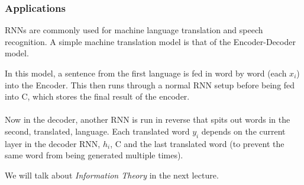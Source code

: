 \documentclass{article}
\begin{document}
\subsubsection{Applications}
RNNs are commonly used for machine language translation and speech recognition. A simple machine translation model is that of the Encoder-Decoder model. 

\begin{center}
\end{center}

In this model, a sentence from the first language is fed in word by word (each $x_i$) into the Encoder. This then runs through a normal RNN setup before being fed into C, which stores the final result of the encoder. 
\\ \\ \noindent 
Now in the decoder, another RNN is run in reverse that spits out words in the second, translated, language. Each translated word  $y_i$ depends on the current layer in the decoder RNN, $h_i$, C and the last translated word (to prevent the same word from being generated multiple times). 
\begin{remark}
We will talk about \emph{Information Theory} in the next lecture.
\end{remark}
\end{document}
